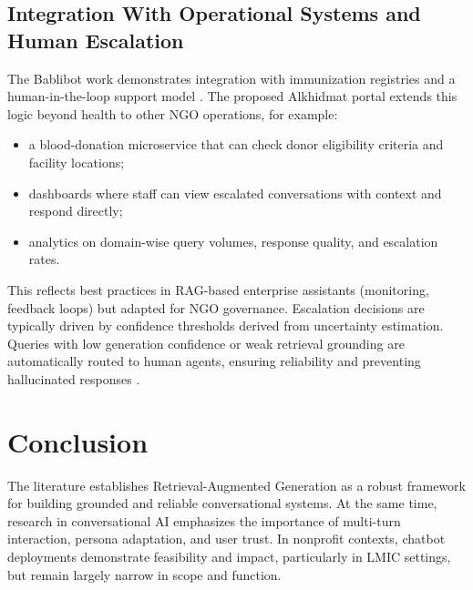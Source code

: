 \subsection{Integration With Operational Systems and Human Escalation}
The Bablibot work demonstrates integration with immunization registries and a human-in-the-loop support model \cite{siddiqi2024bablibot,munir2021bablibot}. The proposed Alkhidmat portal extends this logic beyond health to other NGO operations, for example:
\begin{itemize}\setlength{\itemsep}{0pt}
    \item a blood-donation microservice that can check donor eligibility criteria and facility locations;
    \item dashboards where staff can view escalated conversations with context and respond directly;
    \item analytics on domain-wise query volumes, response quality, and escalation rates.
\end{itemize}
This reflects best practices in RAG-based enterprise assistants (monitoring, feedback loops) but adapted for NGO governance.
Escalation decisions are typically driven by confidence thresholds derived from uncertainty estimation. Queries with low generation confidence or weak retrieval grounding are automatically routed to human agents, ensuring reliability and preventing hallucinated responses \cite{mit2022overconfidence,cyara2023threshold}.

\section{Conclusion}
The literature establishes Retrieval-Augmented Generation as a robust framework for building grounded and reliable conversational systems. At the same time, research in conversational AI emphasizes the importance of multi-turn interaction, persona adaptation, and user trust. In nonprofit contexts, chatbot deployments demonstrate feasibility and impact, particularly in LMIC settings, but remain largely narrow in scope and function.